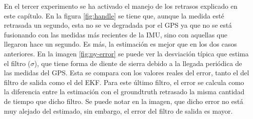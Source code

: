En el tercer experimento se ha activado el manejo de los retrasos explicado en este capítulo. En la figura \ref{fig:handle} se tiene que, aunque la medida esté retrasada un segundo, esta no se ve degradada por el GPS ya que no se está fusionando con las medidas más recientes de la IMU, sino con aquellas que llegaron hace un segundo. Es más, la estimación es mejor que en los dos casos anteriores. 
En la imagen \ref{fig:py-error} se puede ver la desviación típica que estima el filtro ($\sigma$), que tiene forma de diente de sierra debido a la llegada periódica de las medidas del GPS. Esta se compara con los valores reales del error, tanto el del filtro de salida como el del EKF. Para este último filtro, el error se calcula como la diferencia entre la estimación con el groundtruth retrasado la misma cantidad de tiempo que dicho filtro. Se puede notar en la imagen, que dicho error no está muy alejado del estimado, sin embargo, el error del filtro de salida es mayor. 

